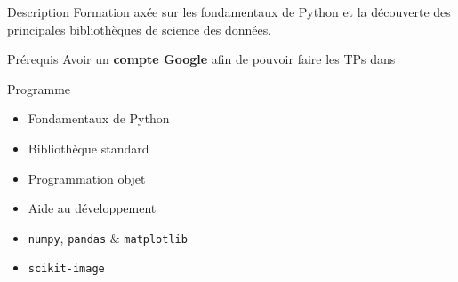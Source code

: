 \begin{frame}{Description}
  Formation axée sur les fondamentaux de Python et la découverte des principales bibliothèques de science des données.
\end{frame}

\begin{frame}{Prérequis}
  Avoir un \textbf{compte Google} afin de pouvoir faire les TPs dans 
\end{frame}

\begin{frame}{Programme}
  \begin{itemize}
    \item Fondamentaux de Python
    \item Bibliothèque standard
    \item Programmation objet
    \item Aide au développement
    \item \texttt{numpy}, \texttt{pandas} \& \texttt{matplotlib}
    \item \texttt{scikit-image}
  \end{itemize}
\end{frame}

